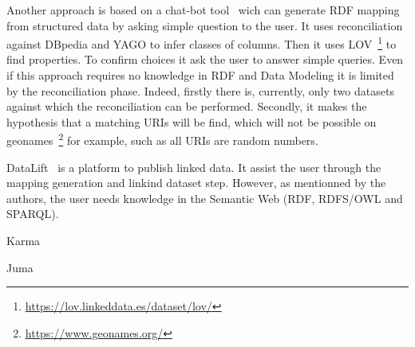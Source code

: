 Another approach is based on a chat-bot tool~\cite{moreau2019semi} wich can generate RDF mapping from structured data by asking simple question to the user.
It uses reconciliation against DBpedia and YAGO to infer classes of columns. Then it uses LOV~\footnote{\url{https://lov.linkeddata.es/dataset/lov/}}
to find properties. To confirm choices it ask the user to answer simple queries. Even if this approach requires no knowledge in RDF and Data Modeling
it is limited by the reconciliation phase. Indeed, firstly there is, currently, only two datasets against which the reconciliation can be performed. Secondly,
it makes the hypothesis that a matching URIs will be find, which will not be possible on geonames~\footnote{\url{https://www.geonames.org/}} 
for example, such as all URIs are random numbers.

DataLift~\cite{scharffe2012enabling} is a platform to publish linked data. It assist the user through the mapping generation and linkind dataset
step. However, as mentionned by the authors, the user needs knowledge in the Semantic Web (RDF, RDFS/OWL and SPARQL).

Karma

Juma